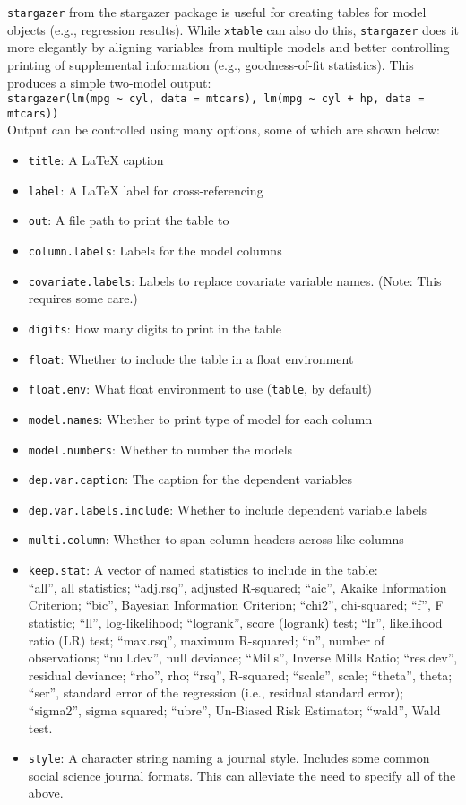 \documentclass[11pt, a4paper]{article}
\begin{document}
\texttt{stargazer} from the stargazer package is useful for creating tables for model objects (e.g., regression results). While \texttt{xtable} can also do this, \texttt{stargazer} does it more elegantly by aligning variables from multiple models and better controlling printing of supplemental information (e.g., goodness-of-fit statistics). This produces a simple two-model output:\\ \verb|stargazer(lm(mpg ~ cyl, data = mtcars), lm(mpg ~ cyl + hp, data = mtcars))|\\Output can be controlled using many options, some of which are shown below:

\begin{itemize}
\item \texttt{title}: A \LaTeX{} caption
\item \texttt{label}: A \LaTeX{} label for cross-referencing
\item \texttt{out}: A file path to print the table to
\item \texttt{column.labels}: Labels for the model columns
\item \texttt{covariate.labels}: Labels to replace covariate variable names. (Note: This requires some care.)
\item \texttt{digits}: How many digits to print in the table
\item \texttt{float}: Whether to include the table in a float environment
\item \texttt{float.env}: What float environment to use (\texttt{table}, by default)
\item \texttt{model.names}: Whether to print type of model for each column
\item \texttt{model.numbers}: Whether to number the models
\item \texttt{dep.var.caption}: The caption for the dependent variables
\item \texttt{dep.var.labels.include}: Whether to include dependent variable labels
\item \texttt{multi.column}: Whether to span column headers across like columns
\item \texttt{keep.stat}: A vector of named statistics to include in the table:\\``all'', all statistics; ``adj.rsq'', adjusted R-squared; ``aic'', Akaike Information Criterion; ``bic'', Bayesian Information Criterion; ``chi2'', chi-squared; ``f'', F statistic; ``ll'', log-likelihood; ``logrank'', score (logrank) test; ``lr'', likelihood ratio (LR) test; ``max.rsq'', maximum R-squared; ``n'', number of observations; ``null.dev'', null deviance; ``Mills'', Inverse Mills Ratio; ``res.dev'', residual deviance; ``rho'', rho; ``rsq'', R-squared; ``scale'', scale; ``theta'', theta; ``ser'', standard error of the regression (i.e., residual standard error); ``sigma2'', sigma squared; ``ubre'', Un-Biased Risk Estimator; ``wald'', Wald test.
\vspace{1em}
\item \texttt{style}: A character string naming a journal style. Includes some common social science journal formats. This can alleviate the need to specify all of the above.
\end{itemize}
\end{document}

